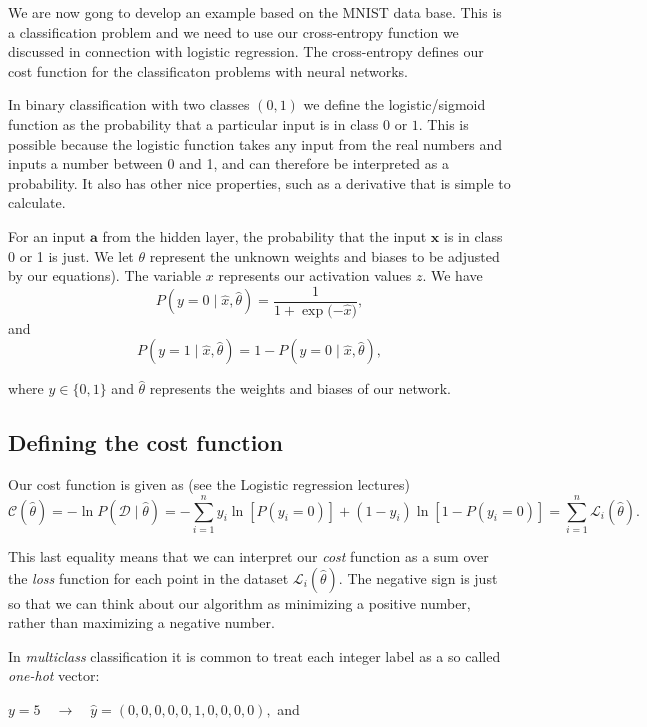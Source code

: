 \documentclass[%
oneside,                 %
final,                   %
10pt]{article}
\begin{document}
We are now gong to develop an example based on the MNIST data
base. This is a classification problem and we need to use our
cross-entropy function we discussed in connection with logistic
regression. The cross-entropy defines our cost function for the
classificaton problems with neural networks.

In binary classification with two classes $(0, 1)$ we define the
logistic/sigmoid function as the probability that a particular input
is in class $0$ or $1$.  This is possible because the logistic
function takes any input from the real numbers and inputs a number
between 0 and 1, and can therefore be interpreted as a probability. It
also has other nice properties, such as a derivative that is simple to
calculate.

For an input $\boldsymbol{a}$ from the hidden layer, the probability that the input $\boldsymbol{x}$
is in class 0 or 1 is just. We let $\theta$ represent the unknown weights and biases to be adjusted by our equations). The variable $x$
represents our activation values $z$. We have
\[
P(y = 0 \mid \hat{x}, \hat{\theta}) = \frac{1}{1 + \exp{(- \hat{x}})} ,
\]
and
\[
P(y = 1 \mid \hat{x}, \hat{\theta}) = 1 - P(y = 0 \mid \hat{x}, \hat{\theta}) ,
\]

where $y \in \{0, 1\}$  and $\hat{\theta}$ represents the weights and biases
of our network.


\subsection*{Defining the cost function}

Our cost function is given as (see the Logistic regression lectures)
\[
\mathcal{C}(\hat{\theta}) = - \ln P(\mathcal{D} \mid \hat{\theta}) = - \sum_{i=1}^n
y_i \ln[P(y_i = 0)] + (1 - y_i) \ln [1 - P(y_i = 0)] = \sum_{i=1}^n \mathcal{L}_i(\hat{\theta}) .
\]

This last equality means that we can interpret our \emph{cost} function as a sum over the \emph{loss} function
for each point in the dataset $\mathcal{L}_i(\hat{\theta})$.  
The negative sign is just so that we can think about our algorithm as minimizing a positive number, rather
than maximizing a negative number.  

In \emph{multiclass} classification it is common to treat each integer label as a so called \emph{one-hot} vector:  

$y = 5 \quad \rightarrow \quad \hat{y} = (0, 0, 0, 0, 0, 1, 0, 0, 0, 0) ,$ and
\end{document}
